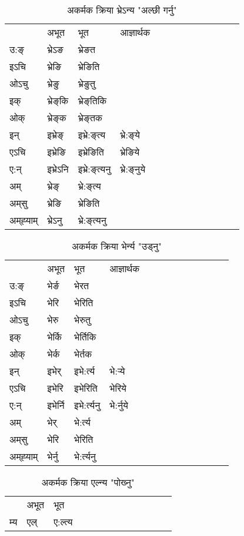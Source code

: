 \begin{table}[H]
\centering
\caption{\label{eŋ.vi} अकर्मक क्रिया  भ्रेऽन्य  "अल्छी गर्नु"  }
\begin{tabular}{l|l|l|l|l|l|l|l|l|l|l|l|l}  \toprule
&अभूत & भूत & आज्ञार्थक \\ 
उ:ङ्‌ &भ्रेऽङ &भ्रेङत \\ 
इऽचि &भ्रेङि &भ्रेङिति   \\ 
ओऽचु &भ्रेङु &भ्रेङुतु   \\ 
इक् &भ्रेङ्‌कि &भ्रेङ्‌तिकि   \\ 
ओक् &भ्रेङ्‌क &भ्रेङ्‌तक   \\ 
इन् & इभ्रेङ्‌ & इभ्रे:ङ्‌त्य &भ्रे:ङ्‌ये  \\ 
एऽचि & इभ्रेङि & इभ्रेङिति &भ्रेङिये    \\ 
ए:न् & इभ्रेऽनि  & इभ्रे:ङ्‌त्यनु &भ्रे:ङ्‌नुये  \\ 
अम् & भ्रेङ्‌ & भ्रे:ङ्‌त्य   \\ 
अम्‌सु & भ्रेङि & भ्रेङिति   \\ 
अम्‌ह्‍याम् & भ्रेऽनु  & भ्रे:ङ्‌त्यनु \\ 
\bottomrule
\end{tabular}
\end{table}


\begin{table}[H]
\centering
\caption{\label{er.vi} अकर्मक क्रिया  भेर्न्य  "उड्नु"  }
\begin{tabular}{l|l|l|l|l|l|l|l|l|l|l|l|l}  \toprule
&अभूत & भूत & आज्ञार्थक \\ 
उ:ङ्‌ &भेर्ङ &भेरत \\ 
इऽचि &भेरि &भेरिति   \\ 
ओऽचु &भेरु &भेरुतु   \\ 
इक् &भेर्कि &भेर्तिकि   \\ 
ओक् &भेर्क &भेर्तक   \\ 
इन् & इभेर् & इभे:र्त्य &भे:र्‍ये  \\ 
एऽचि & इभेरि & इभेरिति &भेरिये    \\ 
ए:न् & इभेर्नि  & इभे:र्त्यनु &भे:र्नुये  \\ 
अम् & भेर् & भे:र्त्य   \\ 
अम्‌सु & भेरि & भेरिति   \\ 
अम्‌ह्‍याम् & भेर्नु  & भे:र्त्यनु \\ 
\bottomrule
\end{tabular}
\end{table}


\begin{table}[H]
\centering
\caption{\label{el.vi} अकर्मक क्रिया  एल्न्य  "पोख्‍नु"  }
\begin{tabular}{l|l|l|l|l|l|l|l|l|l|l|l|l}  \toprule
&अभूत & भूत   \\ 
म्य & एल् & ए:ल्त्य   \\ 
\bottomrule
\end{tabular}
\end{table}


